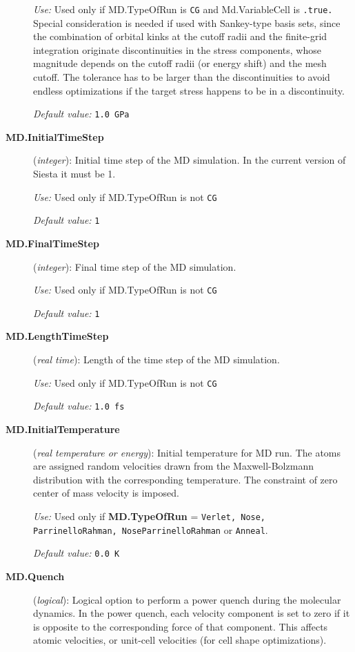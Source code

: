 \documentclass[11pt]{article}
\begin{document}
\begin{description}
{\it Use:} Used only if MD.TypeOfRun is {\tt CG} and Md.VariableCell
is {\tt .true.}
Special consideration is needed if used with Sankey-type basis sets, since 
the combination of orbital kinks at the cutoff radii and the finite-grid
integration originate discontinuities in the
stress components, whose magnitude depends on the cutoff radii (or 
energy shift) and the mesh cutoff. The tolerance has to be larger
than the discontinuities to avoid endless optimizations if the target
stress happens to be in a discontinuity.
   
{\it Default value:} {\tt 1.0 GPa}
 
   
\item[{\bf MD.InitialTimeStep}] ({\it integer}): 
Initial time step of the MD simulation.
In the current version of {\sc Siesta} it must be 1.

{\it Use:} Used only if MD.TypeOfRun is not {\tt CG}
    
{\it Default value:} {\tt 1}

\item[{\bf MD.FinalTimeStep}] ({\it integer}): 
Final time step of the MD simulation.

{\it Use:} Used only if MD.TypeOfRun is not {\tt CG}
    
{\it Default value:} {\tt 1}

\item[{\bf MD.LengthTimeStep}] ({\it real time}): 
Length of the time step of the MD simulation.

{\it Use:} Used only if MD.TypeOfRun is not {\tt CG}
    
{\it Default value:} {\tt 1.0 fs}

\item[{\bf MD.InitialTemperature}] ({\it real temperature or energy}): 
Initial temperature for MD run. The atoms are assigned random 
velocities drawn from the Maxwell-Bolzmann distribution with the
corresponding temperature. The constraint of zero center of
mass velocity is imposed.

{\it Use:} Used only if {\bf MD.TypeOfRun} = {\tt Verlet, Nose, 
ParrinelloRahman, NoseParrinelloRahman}
or {\tt Anneal}.

{\it Default value:} {\tt 0.0 K}

\item[{\bf MD.Quench}] ({\it logical}): 
Logical option to perform a power quench during the molecular dynamics. 
In the power quench, each velocity component is set to
zero if it is opposite to the corresponding force
of that component. This affects atomic velocities,
or unit-cell velocities (for cell shape optimizations).


\end{description}
\end{document}
